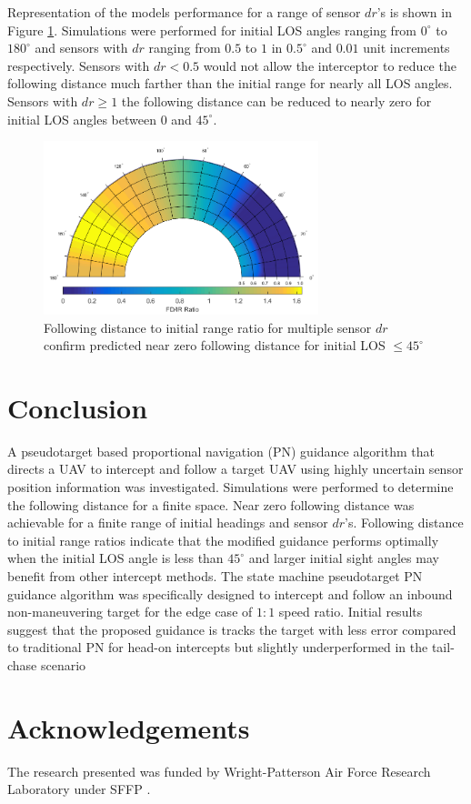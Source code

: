 \documentclass[conference]{IEEEtran}
\begin{document}
Representation of the models performance for a range of sensor $dr$'s is shown in Figure \ref{fig:Polar}. Simulations were performed for initial LOS angles ranging from $0^{\circ}$ to $180^{\circ}$ and sensors with $dr$ ranging from $0.5$ to $1$ in $0.5^{\circ}$ and $0.01$ unit increments respectively. Sensors with $dr < 0.5$ would not allow the interceptor to reduce the following distance much farther than the initial range for nearly all LOS angles. Sensors with $dr \geq 1$ the following distance can be reduced to nearly zero for initial LOS angles between $0$ and $45^{\circ}$. 

\begin{figure}[H]
	\centering
	\includegraphics[width=8cm]{correctpolar.png}
	\caption{Following distance to initial range ratio for multiple sensor $dr$ confirm predicted near zero following distance for initial LOS $\leq45^\circ$}
	\label{fig:Polar}
\end{figure}

\section{Conclusion}



A pseudotarget based proportional navigation (PN) guidance algorithm that directs a UAV to intercept and follow a target UAV using highly uncertain sensor position information was investigated. Simulations were performed to determine the following distance for a finite space. Near zero following distance was achievable for a finite range of initial headings and sensor $dr$'s. Following distance to initial range ratios indicate that the modified guidance performs optimally when the initial LOS angle is less than $45^\circ$ and larger initial sight angles may benefit from other intercept methods. The state machine pseudotarget PN guidance algorithm was specifically designed to intercept and follow an inbound non-maneuvering target for the edge case of $1:1$ speed ratio. Initial results suggest that the proposed guidance is tracks the target with less error compared to traditional PN for head-on intercepts but slightly underperformed in the tail-chase scenario 




\section{Acknowledgements}
The research presented was funded by Wright-Patterson Air Force Research Laboratory under SFFP . 





\end{document}
